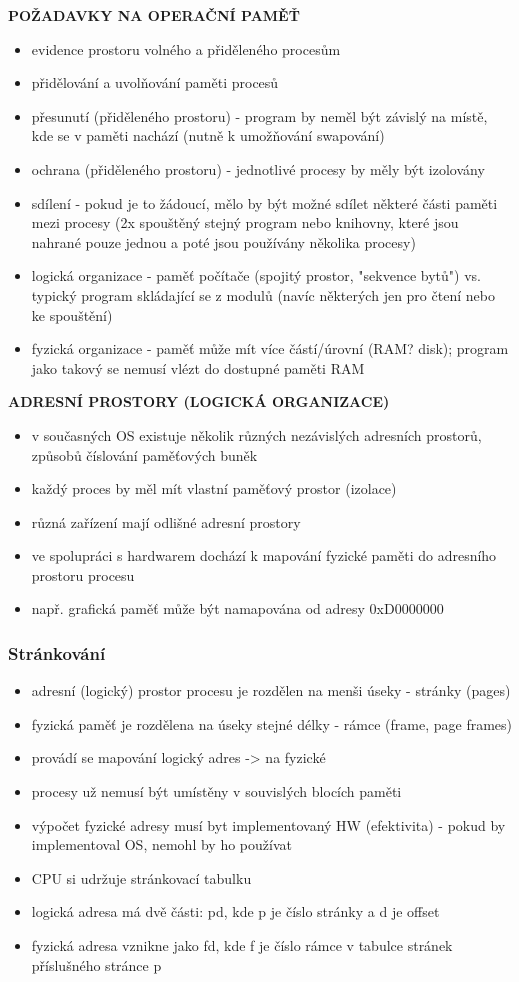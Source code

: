 \documentclass[10pt,a4paper]{article}
\begin{document}
\textbf{POŽADAVKY NA OPERAČNÍ PAMĚŤ}
\begin{itemize}
	\item evidence prostoru volného a přiděleného procesům
	\item přidělování a uvolňování paměti procesů
	\item přesunutí (přiděleného prostoru) - program by neměl být závislý na místě, kde se v paměti
nachází (nutně k umožňování swapování)
	\item ochrana (přiděleného prostoru) - jednotlivé procesy by měly být izolovány
	\item sdílení - pokud je to žádoucí, mělo by být možné sdílet některé části paměti mezi procesy
(2x spouštěný stejný program nebo knihovny, které jsou nahrané pouze jednou a poté jsou
používány několika procesy)
	\item logická organizace - paměť počítače (spojitý prostor, "sekvence bytů") vs. typický program
skládající se z modulů (navíc některých jen pro čtení nebo ke spouštění)
	\item fyzická organizace - paměť může mít více částí/úrovní (RAM? disk); program jako takový
se nemusí vlézt do dostupné paměti RAM
\end{itemize}

\textbf{ADRESNÍ PROSTORY (LOGICKÁ ORGANIZACE)}
\begin{itemize}
	\item v současných OS existuje několik různých nezávislých adresních prostorů, způsobů číslování
paměťových buněk
	\item každý proces by měl mít vlastní paměťový prostor (izolace)
	\item různá zařízení mají odlišné adresní prostory
	\item ve spolupráci s hardwarem dochází k mapování fyzické paměti do adresního prostoru procesu
	\item např. grafická paměť může být namapována od adresy 0xD0000000
\end{itemize}

\subsubsection{Stránkování}
\begin{itemize}
	\item adresní (logický) prostor procesu je rozdělen na menši úseky - stránky (pages)
	\item fyzická paměť je rozdělena na úseky stejné délky - rámce (frame, page frames)
	\item provádí se mapování logický adres -> na fyzické
	\item procesy už nemusí být umístěny v souvislých blocích paměti
	\item výpočet fyzické adresy musí byt implementovaný HW (efektivita) - pokud by implementoval
OS, nemohl by ho používat
	\item CPU si udržuje stránkovací tabulku
	\item logická adresa má dvě části: pd, kde p je číslo stránky a d je offset
	\item fyzická adresa vznikne jako fd, kde f je číslo rámce v tabulce stránek příslušného stránce p
\end{itemize}
\end{document}
